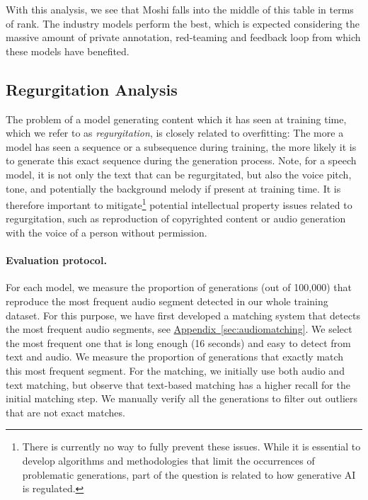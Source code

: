 With this analysis, we see that Moshi falls into the middle of this table in terms of rank. The industry models perform the best, which is expected considering the massive amount of private annotation,  red-teaming and feedback loop from which these models have benefited.  %

\subsection{Regurgitation Analysis} 
\label{sec:regurgitation}

The problem of a model generating content which it has seen at training time, which we refer to as \textit{regurgitation}, is closely related to overfitting: The more a model has seen a sequence or a subsequence during training, the more likely it is to generate this exact sequence during the generation process. Note, for a speech model, it is not only the text that can be regurgitated, but also the voice pitch, tone, and potentially the background melody if present at training time. It is therefore important to mitigate\footnote{There is currently no way to fully prevent these issues. While it is essential to develop algorithms and methodologies that limit the occurrences of problematic generations, part of the question is related to how generative AI is regulated.} potential intellectual property issues related to regurgitation, such as reproduction of copyrighted content or audio generation with the voice of a person without permission. 

\paragraph{Evaluation protocol.}
For each model, we measure the proportion of generations  (out of 100,000) that reproduce the most frequent audio segment detected in our whole training dataset. For this purpose, we have first developed a matching system that detects the most frequent audio segments, see \hyperref[sec:audiomatching]{Appendix~\ref{sec:audiomatching}}. We select the most frequent one that is long enough (16 seconds) and easy to detect from text and audio. We measure the proportion of generations that exactly match this most frequent segment.
For the matching, we initially use both audio and text matching, but observe that text-based matching has a higher recall for the initial matching step. We manually verify all the generations to filter out outliers that are not exact matches.  \smallskip

